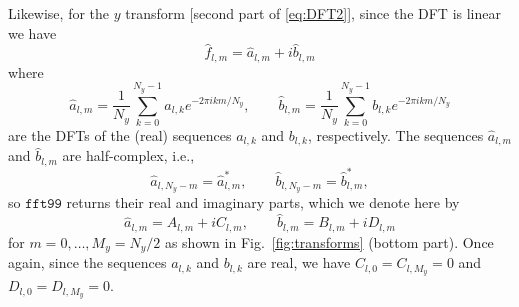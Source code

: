 \documentclass[12pt]{article}
\newcommand{\CC}[1]{{#1}^{*}}           %
\newcommand{\dfc}[1]{\widehat{#1}}  %
\newcommand{\Fc}[1]{\dfc{#1}}       %
\newcommand{\code}[1]{\texttt{#1}}
\begin{document}
Likewise, for the $y$ transform [second part of \eqref{eq:DFT2}],
since the DFT is linear we have
\begin{equation}
   \Fc{f}_{l,m} = \Fc{a}_{l,m} + i\Fc{b}_{l,m}
\label{eq:DFT2:RI}
\end{equation}
where
\begin{equation}
   \Fc{a}_{l,m} = \frac{1}{N_y}\sum_{k=0}^{N_y-1} a_{l,k} e^{-2\pi ikm/N_y},
\qquad
   \Fc{b}_{l,m} = \frac{1}{N_y}\sum_{k=0}^{N_y-1} b_{l,k} e^{-2\pi ikm/N_y}
\label{eq:DFT2:a,b}
\end{equation}
are the DFTs of the (real) sequences $a_{l,k}$ and $b_{l,k}$, respectively.
The sequences $\Fc{a}_{l,m}$ and $\Fc{b}_{l,m}$ are half-complex, i.e.,
\begin{equation}
   \Fc{a}_{l,N_y-m}=\CC{\Fc{a}}_{l,m},
\qquad
   \Fc{b}_{l,N_y-m}=\CC{\Fc{b}}_{l,m},
\label{eq:CC:a,b}
\end{equation}
so $\code{fft99}$ returns their real and imaginary parts, which we denote here 
by
\begin{equation}
   \Fc{a}_{l,m} = A_{l,m} + iC_{l,m},
\qquad
   \Fc{b}_{l,m} = B_{l,m} + iD_{l,m}
\label{eq:DFT2:RI:A,B}
\end{equation}
for $m=0,\dots,M_y=N_y/2$ as shown in Fig.~\ref{fig:transforms} (bottom
part).  Once again, since the sequences $a_{l,k}$ and $b_{l,k}$ are real, 
we have ${C}_{l,0}={C}_{l,M_y}=0$ and ${D}_{l,0}={D}_{l,M_y}=0$.
\end{document}
